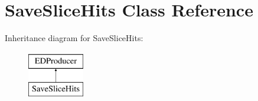 \hypertarget{classSaveSliceHits}{\section{Save\-Slice\-Hits Class Reference}
\label{classSaveSliceHits}
}
Inheritance diagram for Save\-Slice\-Hits\-:\begin{figure}[H]
\begin{center}
\leavevmode
\includegraphics[height=2.000000cm]{classSaveSliceHits}
\end{center}
\end{figure}
